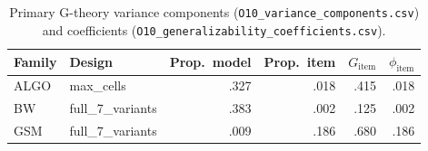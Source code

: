 \begin{table}[t]
\centering
\scriptsize
\caption{Primary G-theory variance components
(\texttt{O10\_variance\_components.csv}) and coefficients
(\texttt{O10\_generalizability\_coefficients.csv}).}
\label{tab:o10}
\begin{tabular}{llrrrr}
\toprule
Family & Design & Prop.\ model & Prop.\ item & $G_{\mathrm{item}}$ & $\phi_{\mathrm{item}}$ \\
\midrule
ALGO & max\_cells & .327 & .018 & .415 & .018 \\
BW & full\_7\_variants & .383 & .002 & .125 & .002 \\
GSM & full\_7\_variants & .009 & .186 & .680 & .186 \\
\bottomrule
\end{tabular}
\end{table}
